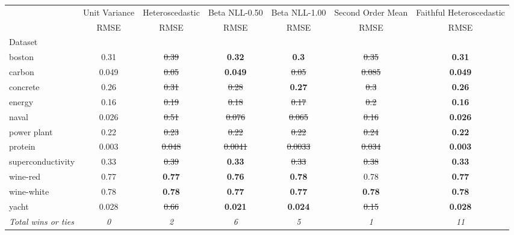 \begin{tabular}{l|c|c|c|c|c|c}
\toprule
{} & {Unit Variance} & {Heteroscedastic} & {Beta NLL-0.50} & {Beta NLL-1.00} & {Second Order Mean} & {Faithful Heteroscedastic} \\
{} & {RMSE} & {RMSE} & {RMSE} & {RMSE} & {RMSE} & {RMSE} \\
{Dataset} & {} & {} & {} & {} & {} & {} \\
\midrule
boston & 0.31 & \sout{0.39} & \textbf{0.32} & \textbf{0.3} & \sout{0.35} & \textbf{0.31} \\
carbon & 0.049 & \sout{0.05} & \textbf{0.049} & \sout{0.05} & \sout{0.085} & \textbf{0.049} \\
concrete & 0.26 & \sout{0.31} & \sout{0.28} & \textbf{0.27} & \sout{0.3} & \textbf{0.26} \\
energy & 0.16 & \sout{0.19} & \sout{0.18} & \sout{0.17} & \sout{0.2} & \textbf{0.16} \\
naval & 0.026 & \sout{0.51} & \sout{0.076} & \sout{0.065} & \sout{0.16} & \textbf{0.026} \\
power plant & 0.22 & \sout{0.23} & \sout{0.22} & \sout{0.22} & \sout{0.24} & \textbf{0.22} \\
protein & 0.003 & \sout{0.048} & \sout{0.0041} & \sout{0.0033} & \sout{0.034} & \textbf{0.003} \\
superconductivity & 0.33 & \sout{0.39} & \textbf{0.33} & \sout{0.33} & \sout{0.38} & \textbf{0.33} \\
wine-red & 0.77 & \textbf{0.77} & \textbf{0.76} & \textbf{0.78} & 0.78 & \textbf{0.77} \\
wine-white & 0.78 & \textbf{0.78} & \textbf{0.77} & \textbf{0.77} & \textbf{0.78} & \textbf{0.78} \\
yacht & 0.028 & \sout{0.66} & \textbf{0.021} & \textbf{0.024} & \sout{0.15} & \textbf{0.028} \\
\textit{{Total wins or ties}} & \textit{0} & \textit{2} & \textit{6} & \textit{5} & \textit{1} & \textit{11} \\
\bottomrule
\end{tabular}
